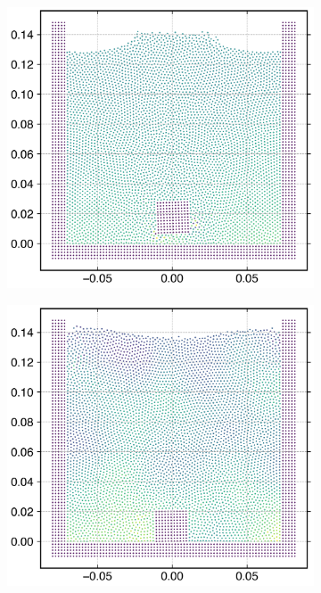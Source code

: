 \begin{figure}[!htpb]
  \begin{subfigure}{0.48\textwidth}
    \centering
    \includegraphics[width=1.0\textwidth]{figures/rfc/figures/qiu_2017_falling_solid_in_water_2d/dx_0_002/time2}
  \end{subfigure}
  \begin{subfigure}{0.48\textwidth}
    \centering
    \includegraphics[width=1.0\textwidth]{figures/rfc/figures/qiu_2017_falling_solid_in_water_2d/dx_0_002/time4}
  \end{subfigure}
\caption{}
\label{fig:snapshots-falling-solid-in-water}
\end{figure}
